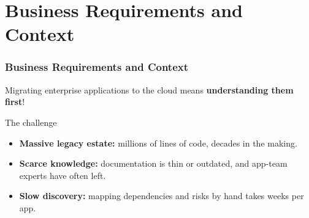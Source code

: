 \documentclass{beamer}
\begin{document}
\section{Business Requirements and Context}
\begin{frame}
\frametitle{Business Requirements and Context}
Migrating enterprise applications to the cloud means \textbf{understanding them
first}!

\vspace{0.1cm}
\begin{block}{\small The challenge}
{\footnotesize
\begin{itemize}\setlength\itemsep{2pt}
  \item \textbf{\color{earlblue}Massive legacy estate:} \colorbox{earlblue!15}{millions of lines of code}, decades in the making.
  \item \textbf{\color{earlblue}Scarce knowledge:} documentation is thin or outdated, and app-team experts have often left.
  \item \textbf{\color{earlblue}Slow discovery:} mapping dependencies and risks by hand takes \colorbox{earlblue!15}{weeks} per app.
\end{itemize}
}
\end{block}


\end{frame}
\end{document}
